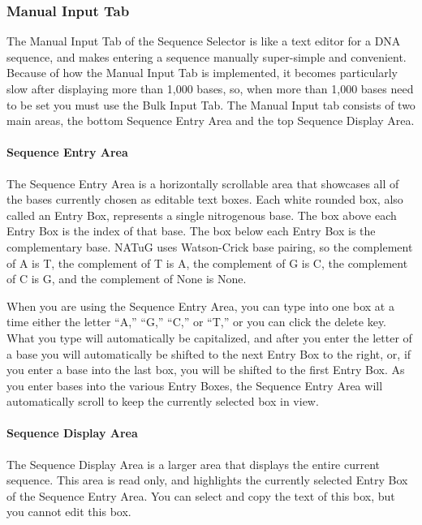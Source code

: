 \documentclass[titlepage]{article}
\begin{document}
\subsubsection{Manual Input Tab}
The Manual Input Tab of the Sequence Selector is like a text editor for a DNA sequence, and makes entering a sequence manually super-simple and convenient. Because of how the Manual Input Tab is implemented, it becomes particularly slow after displaying more than 1,000 bases, so, when more than 1,000 bases need to be set you must use the Bulk Input Tab. The Manual Input tab consists of two main areas, the bottom Sequence Entry Area and the top Sequence Display Area.

\paragraph{Sequence Entry Area}
The Sequence Entry Area is a horizontally scrollable area that showcases all of the bases currently chosen as editable text boxes. Each white rounded box, also called an Entry Box, represents a single nitrogenous base. The box above each Entry Box is the index of that base. The box below each Entry Box is the complementary base. NATuG uses Watson-Crick base pairing, so the complement of A is T, the complement of T is A, the complement of G is C, the complement of C is G, and the complement of None is None.

When you are using the Sequence Entry Area, you can type into one box at a time either the letter ``A,'' ``G,'' ``C,'' or ``T,'' or you can click the delete key. What you type will automatically be capitalized, and after you enter the letter of a base you will automatically be shifted to the next Entry Box to the right, or, if you enter a base into the last box, you will be shifted to the first Entry Box. As you enter bases into the various Entry Boxes, the Sequence Entry Area will automatically scroll to keep the currently selected box in view.
	
\paragraph{Sequence Display Area}
The Sequence Display Area is a larger area that displays the entire current sequence. This area is read only, and highlights the currently selected Entry Box of the Sequence Entry Area. You can select and copy the text of this box, but you cannot edit this box.
\end{document}
